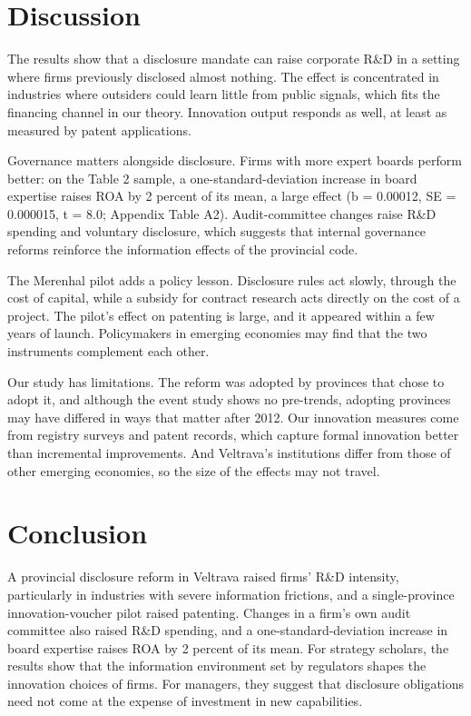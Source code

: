 \documentclass[12pt]{article}
\begin{document}
\section{Discussion}

The results show that a disclosure mandate can raise corporate R\&D in a setting where firms previously disclosed almost nothing. The effect is concentrated in industries where outsiders could learn little from public signals, which fits the financing channel in our theory. Innovation output responds as well, at least as measured by patent applications.

Governance matters alongside disclosure. Firms with more expert boards perform better: on the Table 2 sample, a one-standard-deviation increase in board expertise raises ROA by 2 percent of its mean, a large effect (b = 0.00012, SE = 0.000015, t = 8.0; Appendix Table A2). Audit-committee changes raise R\&D spending and voluntary disclosure, which suggests that internal governance reforms reinforce the information effects of the provincial code.

The Merenhal pilot adds a policy lesson. Disclosure rules act slowly, through the cost of capital, while a subsidy for contract research acts directly on the cost of a project. The pilot's effect on patenting is large, and it appeared within a few years of launch. Policymakers in emerging economies may find that the two instruments complement each other.

Our study has limitations. The reform was adopted by provinces that chose to adopt it, and although the event study shows no pre-trends, adopting provinces may have differed in ways that matter after 2012. Our innovation measures come from registry surveys and patent records, which capture formal innovation better than incremental improvements. And Veltrava's institutions differ from those of other emerging economies, so the size of the effects may not travel.

\section{Conclusion}

A provincial disclosure reform in Veltrava raised firms' R\&D intensity, particularly in industries with severe information frictions, and a single-province innovation-voucher pilot raised patenting. Changes in a firm's own audit committee also raised R\&D spending, and a one-standard-deviation increase in board expertise raises ROA by 2 percent of its mean. For strategy scholars, the results show that the information environment set by regulators shapes the innovation choices of firms. For managers, they suggest that disclosure obligations need not come at the expense of investment in new capabilities.
\end{document}

